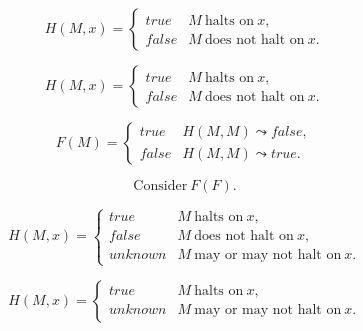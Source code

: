 \begin{frame}

$$H(M,x)=\left\{
\begin{array}{ll}
true&M\ \text{halts on}\ x,\\
false&M\ \text{does not halt on}\ x.
\end{array}
\right.$$

\end{frame}

\begin{frame}

$$H(M,x)=\left\{
\begin{array}{ll}
true&M\ \text{halts on}\ x,\\
false&M\ \text{does not halt on}\ x.
\end{array}
\right.$$

$$F(M)=\left\{
\begin{array}{ll}
true& H(M,M) \leadsto false,\\
false& H(M,M) \leadsto true.
\end{array}
\right.$$

$$\text{Consider}\ F(F).$$

\end{frame}

\begin{frame}

$$H(M,x)=\left\{
\begin{array}{ll}
true&M\ \text{halts on}\ x,\\
false&M\ \text{does not halt on}\ x,\\
unknown&M\ \text{may or may not halt on}\ x.
\end{array}
\right.$$


\end{frame}

\begin{frame}

$$H(M,x)=\left\{
\begin{array}{ll}
true&M\ \text{halts on}\ x,\\
unknown&M\ \text{may or may not halt on}\ x.
\end{array}
\right.$$


\end{frame}
